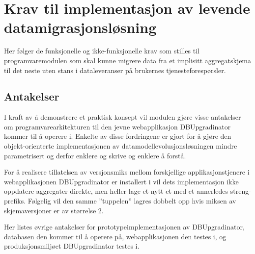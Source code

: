 \section{Krav til implementasjon av levende datamigrasjonsløsning}

Her følger de funksjonelle og ikke-funksjonelle krav som stilles til programvaremodulen som skal kunne migrere data fra et implisitt aggregatskjema til det neste uten stans i dataleveranser på brukernes tjenesteforespørsler.

\subsection{Antakelser}

I kraft av å demonstrere et praktisk konsept vil modulen gjøre visse antakelser om programvarearkitekturen til den jevne webapplikasjon DBUpgradinator kommer til å operere i. Enkelte av disse fordringene er gjort for å gjøre den objekt-orienterte implementasjonen av datamodellevolusjonsløsningen mindre parametrisert og derfor enklere og skrive og enklere å forstå.

For å realisere tillatelsen av versjonsmiks mellom forskjellige applikasjonstjenere i webapplikasjonen DBUpgradinator er installert i vil dets implementasjon ikke oppdatere aggregater direkte, men heller lage et nytt et med et annerledes streng-prefiks. Følgelig vil den samme ''tuppelen'' lagres dobbelt opp hvis miksen av skjemaversjoner er av størrelse 2.

Her listes øvrige antakelser for prototypeimplementasjonen av DBUpgradinator, databasen den kommer til å operere på, webapplikasjonen den testes i, og produksjonsmiljøet DBUpgradinator testes i.


